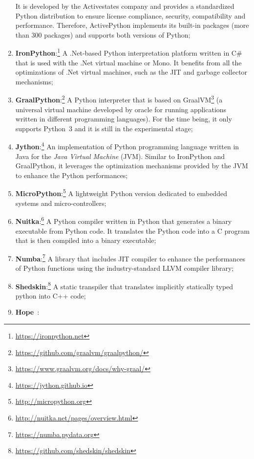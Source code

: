 \begin{enumerate}
            It is developed by the Activestates company and provides a standardized Python distribution to ensure license compliance, security, compatibility and performance.
            Therefore, ActivePython implements its built-in packages (more than 300 packages) and supports both versions of Python;
      \item \textbf{IronPython}:\footnote{\url{https://ironpython.net}}
            A .Net-based Python interpretation platform written in C\# that is used with the .Net virtual machine or Mono.
            It benefits from all the optimizations of .Net virtual machines, such as the JIT and garbage collector mechanisms;
      \item \textbf{GraalPython}:\footnote{\url{https://github.com/graalvm/graalpython/}}
            A Python interpreter that is based on GraalVM\footnote{\url{https://www.graalvm.org/docs/why-graal/}} (a universal virtual machine developed by oracle for running applications written in different programming languages).
            For the time being, it only supports Python~3 and it is still in the experimental stage;
      \item \textbf{Jython}:\footnote{\url{https://jython.github.io}}
            An implementation of Python programming language written in Java for the \emph{Java Virtual Machine} (JVM).
            Similar to IronPython and GraalPython, it leverages the optimization mechanisms provided by the JVM to enhance the Python performances;
      \item \textbf{MicroPython}:\footnote{\url{http://micropython.org}}
            A lightweight Python version dedicated to embedded systems and micro-controllers;
      \item \textbf{Nuitka}:\footnote{\url{http://nuitka.net/pages/overview.html}}
            A Python compiler written in Python that generates a binary executable from Python code.
            It translates the Python code into a C program that is then compiled into a binary executable;
      \item \textbf{Numba}:\footnote{\url{https://numba.pydata.org}}
            A library that includes JIT compiler to enhance the performances of Python functions using the industry-standard LLVM compiler library;
      \item \textbf{Shedskin}:\footnote{\url{https://github.com/shedskin/shedskin}}
            A static transpiler that translates implicitly statically typed python into C++ code;
      \item \textbf{Hope}~\cite{akeret_hope_2015}:

\end{enumerate}
